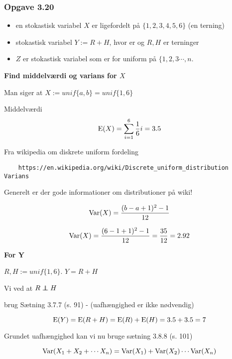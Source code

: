 \subsubsection{Opgave 3.20}

\begin{itemize}
    \item en stokastisk variabel $X$ er ligefordelt på $\{1, 2, 3, 4, 5, 6\}$ (en terning)
    \item stokastisk variabel $Y:= R + H$, hvor er og $R, H$ er terninger
    \item $Z$ er stokastisk variabel som er for uniform på $\{1, 2, 3\cdots, n$.
\end{itemize}

\textbf{Find middelværdi og varians for $X$}

Man siger at $X:= unif\{a,b\} = unif\{1, 6\}$

Middelværdi 
\begin{equation}
    \text{E}(X) = \sum_{i=1}^6\frac{1}{6} i = 3.5
\end{equation}

Fra wikipedia om diskrete uniform fordeling \begin{verbatim}
    https://en.wikipedia.org/wiki/Discrete_uniform_distribution
Varians
\end{verbatim}
Generelt er der gode informationer om distributioner på wiki!

\begin{equation}
    \text{Var}(X) = \frac{(b-a+1)^2-1}{12}
\end{equation}

\begin{equation}
    \text{Var}(X) = \frac{(6 - 1 + 1)^2-1}{12} = \frac{35}{12} = 2.92
\end{equation}

\textbf{For Y}

$R, H := unif\{1,6\}$. $Y=R+H$

Vi ved at $R \independent H$

brug Sætning 3.7.7 (s. 91) - (uafhængighed er ikke nødvendig)

\begin{equation}
   \text{E}(Y) = \text{E}(R+H)=\text{E}(R) + \text{E}(H) = 3.5 + 3.5 = 7 
\end{equation}

Grundet uafhængighed kan vi nu bruge sætning 3.8.8 (s. 101)

\begin{equation}
    \text{Var}(X_1 + X_2 + \cdots X_n) = \text{Var}(X_1) + \text{Var}(X_2) \cdots \text{Var}(X_n)
\end{equation}

